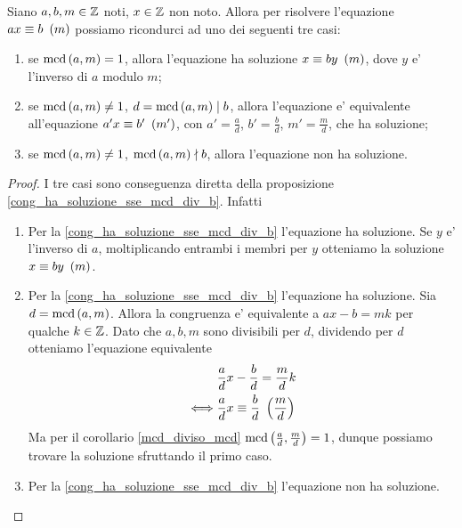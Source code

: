 \begin{proposition}
    Siano $a, b, m \in \mathbb{Z}$ noti, $x \in \mathbb{Z}$ non noto. Allora per risolvere l'equazione $ax \equiv b \ \left(m\right)$ possiamo ricondurci ad uno dei seguenti tre casi:
    \begin{enumerate}
        \item se $\operatorname{mcd}\left(a, m\right) = 1$, allora l'equazione ha soluzione $x \equiv by \ \left(m\right)$, dove $y$ e' l'inverso di $a$ modulo $m$;
        \item se $\operatorname{mcd}\left(a, m\right) \neq 1$, $d = \operatorname{mcd}\left(a, m\right) \mid b$, allora l'equazione e' equivalente all'equazione $a'x \equiv b' \ \left(m'\right)$, con $a' = \frac{a}{d}$, $b' = \frac{b}{d}$, $m' = \frac{m}{d}$, che ha soluzione;
        \item se $\operatorname{mcd}\left(a, m\right) \neq 1$, $\operatorname{mcd}\left(a, m\right) \nmid b$, allora l'equazione non ha soluzione.
    \end{enumerate}
\end{proposition}
\begin{proof}
    I tre casi sono conseguenza diretta della proposizione \ref{cong_ha_soluzione_sse_mcd_div_b}. Infatti
    \begin{enumerate}
        \item Per la \ref{cong_ha_soluzione_sse_mcd_div_b} l'equazione ha soluzione. Se $y$ e' l'inverso di $a$, moltiplicando entrambi i membri per $y$ otteniamo la soluzione $x \equiv by \ \left(m\right)$.
        \item Per la \ref{cong_ha_soluzione_sse_mcd_div_b} l'equazione ha soluzione. 
        Sia $d = \operatorname{mcd}\left(a, m\right)$. Allora la congruenza e' equivalente a $ax - b = mk$ per qualche $k \in \mathbb{Z}$. Dato che $a, b, m$ sono divisibili per $d$, dividendo per $d$ otteniamo l'equazione equivalente
        \begin{alignat*}
            {1}
            &\frac{a}{d}x - \frac{b}{d} = \frac{m}{d}k \\
            \iff &\frac{a}{d}x \equiv \frac{b}{d} \ \left(\frac{m}{d}\right)
        \end{alignat*}
        Ma per il corollario \ref{mcd_diviso_mcd} $\operatorname{mcd}\left(\frac{a}{d}, \frac{m}{d}\right) = 1$, dunque possiamo trovare la soluzione sfruttando il primo caso.
        \item Per la \ref{cong_ha_soluzione_sse_mcd_div_b} l'equazione non ha soluzione. 
    \end{enumerate}
\end{proof}

